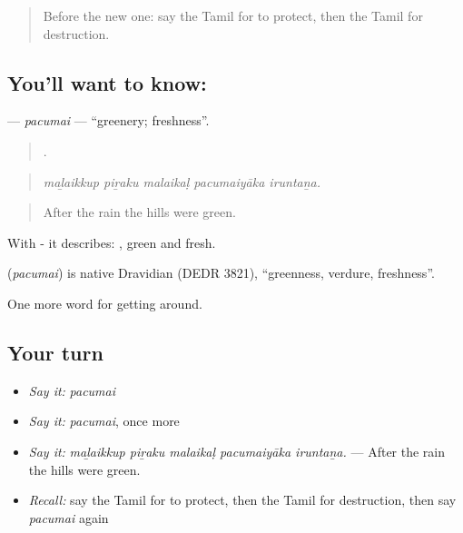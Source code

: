 \label{lesson:TA-C442-pacumai}



\begin{quote}
Before the new one: say the Tamil for to protect, then the Tamil for destruction.
\end{quote}

\subsection*{You'll want to know: }
\textbf{} — \emph{pacumai} — \textquotedblleft{}greenery; freshness\textquotedblright{}.

\begin{quote}
    .
\end{quote}

\begin{quote}
\emph{maḻaikkup piṟaku malaikaḷ pacumaiyāka iruntaṉa.}
\end{quote}

\begin{quote}
After the rain the hills were green.
\end{quote}

With - it describes: , green and fresh.

\begin{cousinweb}
\textbf{} (\emph{pacumai}) is native Dravidian (DEDR 3821), \textquotedblleft{}greenness, verdure, freshness\textquotedblright{}.
\end{cousinweb}

\begin{grammarlens}[title={What you've built}]
One more word for getting around.
\end{grammarlens}

\subsection*{Your turn}
\begin{itemize}
\raggedright
  \item \emph{Say it:} \emph{pacumai}
  \item \emph{Say it:} \emph{pacumai}, once more
  \item \emph{Say it:} \emph{maḻaikkup piṟaku malaikaḷ pacumaiyāka iruntaṉa.} — After the rain the hills were green.
  \item \emph{Recall:} say the Tamil for to protect, then the Tamil for destruction, then say \emph{pacumai} again
\end{itemize}


